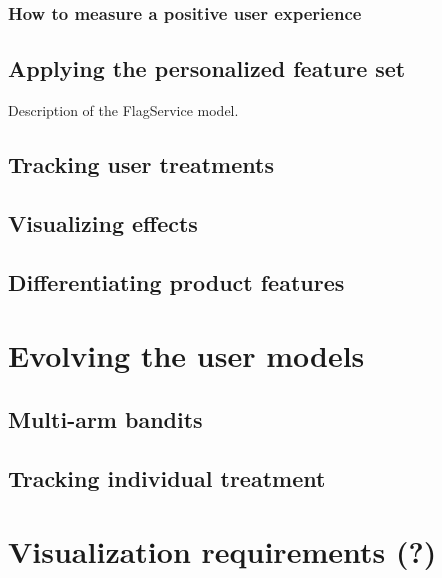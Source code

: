 \subsubsection{How to measure a positive user experience} %


\subsection{Applying the personalized feature set} %
\label{sub:applying_the_personalized_feature_set}

Description of the FlagService model.


\subsection{Tracking user treatments} %
\label{sub:tracking_user_treatments}


\subsection{Visualizing effects} %
\label{sub:visualizing_effects}



\subsection{Differentiating product features} %
\label{sec:differentiating_product_features}


\section{Evolving the user models} %
\label{sec:evolving_the_user_models}

\subsection{Multi-arm bandits}

\subsection{Tracking individual treatment}


\section{Visualization requirements (?)} %
\label{sec:visualization_requirements}


